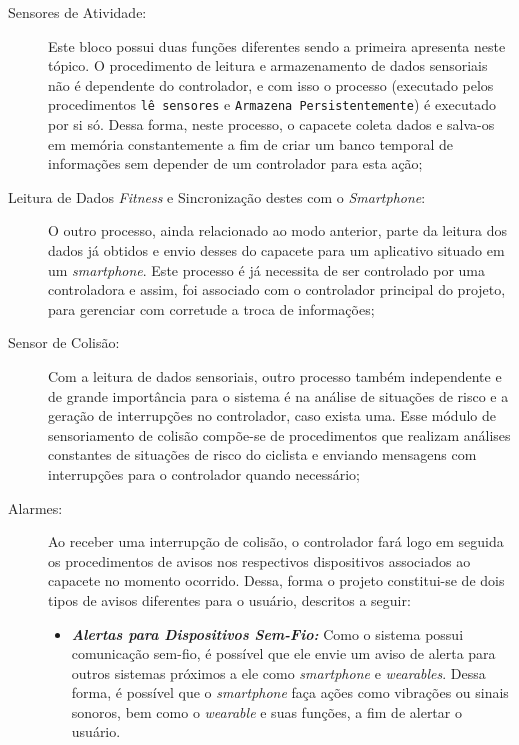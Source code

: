          \begin{description}           
            
            \item [Sensores de Atividade:]
               Este bloco possui duas funções diferentes sendo a primeira apresenta neste tópico.
               O procedimento de leitura e armazenamento de dados sensoriais não é dependente do controlador, e com isso o processo (executado pelos procedimentos \texttt{lê sensores} e \texttt{Armazena Persistentemente}) é executado por si só.
               Dessa forma, neste processo, o capacete coleta dados e salva-os em memória constantemente a fim de criar um banco temporal de informações sem depender de um controlador para esta ação;              
               
            \item [Leitura de Dados \textit{Fitness} e Sincronização destes com o \textit{Smartphone}:]
               O outro processo, ainda relacionado ao modo anterior, parte da leitura dos dados já obtidos e envio desses do capacete para um aplicativo situado em um \textit{smartphone}.
               Este processo é já necessita de ser controlado por uma controladora e assim, foi associado com o controlador principal do projeto, para gerenciar com corretude a troca de informações;
               
            \item [Sensor de Colisão:]
               Com a leitura de dados sensoriais, outro processo também independente e de grande importância para o sistema é na análise de situações de risco e a geração de interrupções no controlador, caso exista uma.
               Esse módulo de sensoriamento de colisão compõe-se de procedimentos que realizam análises constantes de situações de risco do ciclista e enviando mensagens com interrupções para o controlador quando necessário;
               
            
            \item [Alarmes:] 
               Ao receber uma interrupção de colisão, o controlador fará logo em seguida os procedimentos de avisos nos respectivos dispositivos associados ao capacete no momento ocorrido.
               Dessa, forma o projeto constitui-se de dois tipos de avisos diferentes para o usuário, descritos a seguir:
               
               \begin{itemize}
                  \item \textbf{\textit{Alertas para Dispositivos Sem-Fio:}} 
                     Como o sistema possui comunicação sem-fio, é possível que ele envie um aviso de alerta para outros sistemas próximos a ele como \textit{smartphone} e \textit{wearables}.
                     Dessa forma, é possível que o \textit{smartphone} faça ações como vibrações ou sinais sonoros, bem como o \textit{wearable} e suas funções, a fim de alertar o usuário.
                  

\end{itemize}
\end{description}
